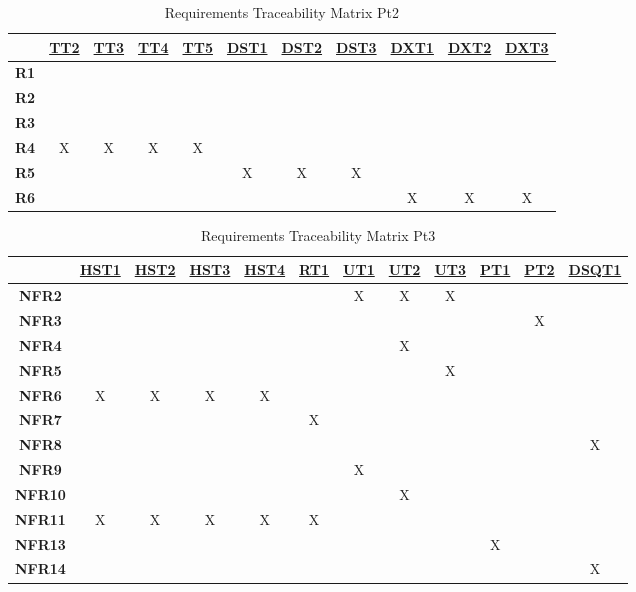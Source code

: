 \documentclass[12pt, titlepage]{article}
\begin{document}
\begin{table}[H]
	\centering
	\begin{tabular}{|c|c|c|c|c|c|c|c|c|c|c|}
	\hline
	& \hyperref[TT2]{TT2}&\hyperref[TT3]{TT3}& \hyperref[TT4]{TT4} &\hyperref[TT5]{TT5}&\hyperref[DST1]{DST1}&\hyperref[DST2]{DST2}&\hyperref[DST3]{DST3}&\hyperref[DXT1]{DXT1}&\hyperref[DXT2]{DXT2}&\hyperref[DXT3]{DXT3} \\
	\hline     
	\textbf{R1}         &&&&&&&&&& \\ \hline
	\textbf{R2}       	 &&&&&&&&&&\\ \hline
	\textbf{R3}         &&&&&&&&&& \\ \hline
	\textbf{R4}         &X&X&X&X&&&&&&\\ \hline
	\textbf{R5}          &&&&&X&X&X&&& \\ \hline
	\textbf{R6}         &&&&&&&&X&X&X\\ \hline
	\hline
	\end{tabular}
	\caption{Requirements Traceability Matrix Pt2}
	\label{Table:B_trace}
\end{table}

\begin{table}[H]
	\centering
	\begin{tabular}{|c|c|c|c|c|c|c|c|c|c|c|c|}
	\hline
	& \hyperref[HST1]{HST1}&\hyperref[HST2]{HST2}& \hyperref[HST3]{HST3} &\hyperref[HST4]{HST4}&\hyperref[RT1]{RT1}&\hyperref[UT1]{UT1}&\hyperref[UT2]{UT2}&\hyperref[UT3]{UT3}&\hyperref[PT1]{PT1}&\hyperref[PT2]{PT2}&\hyperref[DSQT1]{DSQT1} \\
	\hline       
	\textbf{NFR2}         &&&&&&X&X&X&&&\\ \hline
	\textbf{NFR3}         &&&&&&&&&&X& \\ \hline
	\textbf{NFR4}         &&&&&&&X&&&&\\ \hline
	\textbf{NFR5}         &&&&&&&&X&&& \\ \hline
	\textbf{NFR6}         &X&X&X&X&&&&&&&\\ \hline
	\textbf{NFR7}         &&&&&X&&&&&&\\ \hline
	\textbf{NFR8}         &&&&&&&&&&&X\\ \hline
	\textbf{NFR9}         &&&&&&X&&&&&\\ \hline
	\textbf{NFR10}       &&&&&&&X&&&&\\ \hline
	\textbf{NFR11}       &X&X&X&X&X&&&&&&\\ \hline
	\textbf{NFR13}       &&&&&&&&&X&&\\ \hline
	\textbf{NFR14}       &&&&&&&&&&&X\\ \hline
	\hline
	\end{tabular}
	\caption{Requirements Traceability Matrix Pt3}
	\label{Table:C_trace}
\end{table}
\newpage
\end{document}
